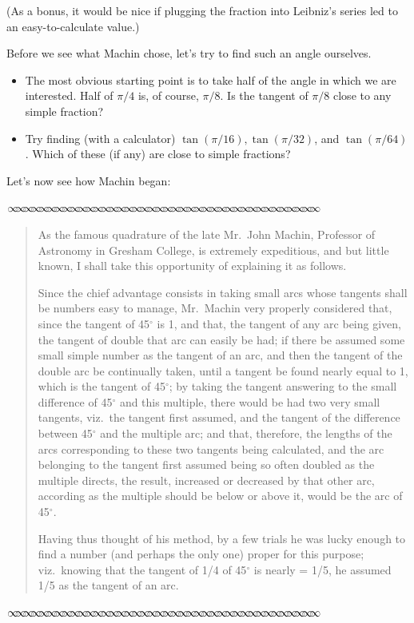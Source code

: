 \documentclass[11pt]{article}
\newcommand{\sep}{\vspace{-3pt}
\begin{center}
{\mathversion{normal}
$\infty \mspace{-5.5mu}\infty \mspace{-5.5mu}\infty \mspace{-5.5mu}\infty \mspace{-5.5mu}
\infty \mspace{-5.5mu}\infty \mspace{-5.5mu}\infty \mspace{-5.5mu}\infty \mspace{-5.5mu}
\infty \mspace{-5.5mu}\infty \mspace{-5.5mu}\infty \mspace{-5.5mu}\infty \mspace{-5.5mu}
\infty \mspace{-5.5mu}\infty \mspace{-5.5mu}\infty \mspace{-5.5mu}\infty \mspace{-5.5mu}
\infty \mspace{-5.5mu}\infty \mspace{-5.5mu}\infty \mspace{-5.5mu}\infty \mspace{-5.5mu}
\infty \mspace{-5.5mu}\infty \mspace{-5.5mu}\infty \mspace{-5.5mu}\infty \mspace{-5.5mu}
\infty \mspace{-5.5mu}\infty \mspace{-5.5mu}\infty \mspace{-5.5mu}\infty \mspace{-5.5mu}
\infty \mspace{-5.5mu}\infty \mspace{-5.5mu}\infty \mspace{-5.5mu}\infty \mspace{-5.5mu}
\infty \mspace{-5.5mu}\infty \mspace{-5.5mu}\infty \mspace{-5.5mu}\infty \mspace{-5.5mu}
\infty \mspace{-5.5mu}\infty \mspace{-5.5mu}\infty \mspace{-5.5mu}\infty \mspace{-5.5mu}$}
\end{center} \vspace*{-5pt}}
\newenvironment{source}%
 {\bigskip \sep \vspace*{-6pt} \begin{quote}
          \begin{sf}   }
   {   \end{sf}     \end{quote} \vspace*{-6pt} \sep \bigskip}%
\newcounter{tasknumb}
\newcommand{\tasknumb}{\stepcounter{tasknumb}\textmd{\textbf{$\fbox{$\fbox{Task \thetasknumb}$}$}}}
\newenvironment{task}%
 {\begin{itemize}
 \item[\tasknumb]  }
{
    \end{itemize}    }%
\begin{document}
(As a bonus, it would be nice if plugging the fraction into Leibniz's series led to an easy-to-calculate value.)

Before we see what Machin chose, let's try to find such an angle ourselves.

\begin{task}
The most obvious starting point is to take half of the angle in which we are interested.  Half of $\pi/4$ is, of course,  $\pi/8$.  Is the tangent of $\pi/8$ close to any simple fraction?
\end{task}

\begin{task}
Try finding (with a calculator) $\tan(\pi/16), \tan(\pi/32)$, and $\tan(\pi/64)$.  Which of these (if any) are close to simple fractions?
\end{task}

Let's now see how Machin began:

\begin{source}
As the famous quadrature of the late Mr.\ John Machin, Professor of Astronomy in Gresham College,
is extremely expeditious, and but little known, I shall take this opportunity of explaining it as follows.

Since the chief advantage consists in taking small arcs whose tangents shall
be numbers easy to manage, Mr.\ Machin very properly considered that, since
the tangent of 45$^\circ$ is 1, and that, the tangent of any arc being given, the tangent
of double that arc can easily be had; if there be assumed some small
simple number as the tangent of an arc, and then the tangent of the double
arc be continually taken, until a tangent be found nearly equal to 1, which is
the tangent of 45$^\circ$; by taking the tangent answering to the small difference
of 45$^\circ$ and this multiple, there would be had two very small tangents, viz.\
the tangent first assumed, and the tangent of the difference between 45$^\circ$ and
the multiple arc; and that, therefore, the lengths of the arcs corresponding
to these two tangents being calculated, and the arc belonging to the tangent
first assumed being so often doubled as the multiple directs, the result,
increased or decreased by that other arc, according as the multiple should
be below or above it, would be the arc of 45$^\circ$.


Having thus thought of his method, by a few trials he was lucky enough
to find a number (and perhaps the only one) proper for this purpose; viz.\
knowing that the tangent of 1/4 of 45$^\circ$ is nearly = 1/5, he assumed 1/5
as the tangent of an arc.
\end{source}
\end{document}
